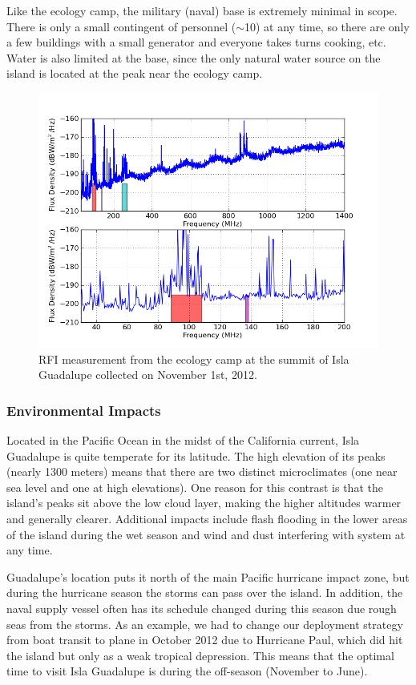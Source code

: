 Like the ecology camp, the military (naval) base is extremely minimal in scope. There is only a small contingent of personnel ($\sim$10) at any time, so there are only a few buildings with a small generator and everyone takes turns cooking, etc. Water is also limited at the base, since the only natural water source on the island is located at the peak near the ecology camp. 

\begin{figure}[tb]
\begin{center}
\includegraphics[width=0.9\linewidth]{RFI_testing/figures/GI_3__bands.png}
\caption{RFI measurement from the ecology camp at the summit of Isla Guadalupe collected on November 1st, 2012.}
\label{Fig:guadsummit}
\end{center}
\end{figure}

\subsubsection{Environmental Impacts}

Located in the Pacific Ocean in the midst of the California current, Isla Guadalupe is quite temperate for its latitude. The high elevation of its peaks (nearly 1300 meters) means that there are two distinct microclimates (one near sea level and one at high elevations). One reason for this contrast is that the island's peaks sit above the low cloud layer, making the higher altitudes warmer and generally clearer. Additional impacts include flash flooding in the lower areas of the island during the wet season and wind and dust interfering with system at any time. 

Guadalupe's location puts it north of the main Pacific hurricane impact zone, but during the hurricane season the storms can pass over the island. In addition, the naval supply vessel often has its schedule changed during this season due rough seas from the storms. As an example, we had to change our deployment strategy from boat transit to plane in October 2012 due to Hurricane Paul, which did hit the island but only as a weak tropical depression. This means that the optimal time to visit Isla Guadalupe is during the off-season (November to June). 


